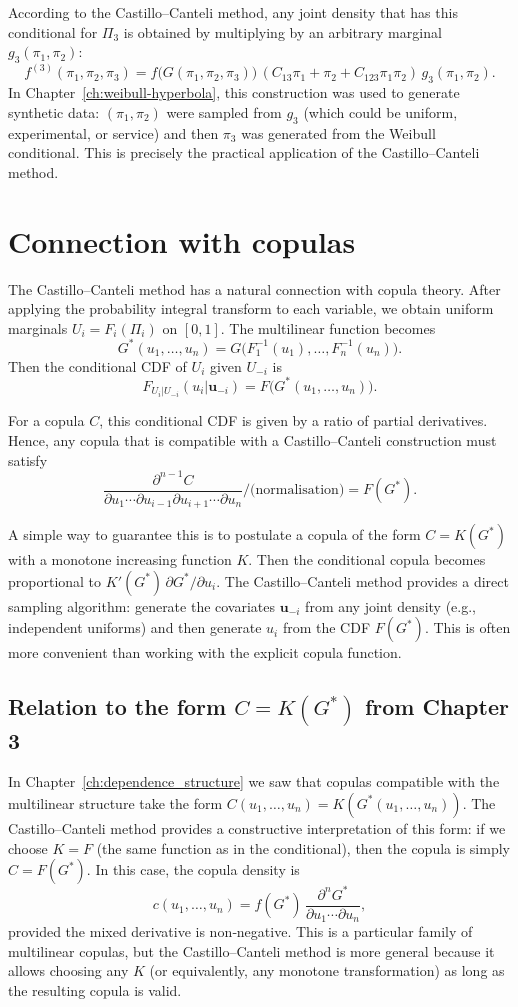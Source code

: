 According to the Castillo–Canteli method, any joint density that has this conditional for \(\Pi_3\) is obtained by multiplying by an arbitrary marginal \(g_3(\pi_1,\pi_2)\):
\[
f^{(3)}(\pi_1,\pi_2,\pi_3) = f\bigl(G(\pi_1,\pi_2,\pi_3)\bigr)\,(C_{13}\pi_1 + \pi_2 + C_{123}\pi_1\pi_2)\,g_3(\pi_1,\pi_2).
\]
In Chapter~\ref{ch:weibull-hyperbola}, this construction was used to generate synthetic data: \((\pi_1,\pi_2)\) were sampled from \(g_3\) (which could be uniform, experimental, or service) and then \(\pi_3\) was generated from the Weibull conditional. This is precisely the practical application of the Castillo–Canteli method.

\section{Connection with copulas}
\label{sec:cc-copulas}

The Castillo–Canteli method has a natural connection with copula theory. After applying the probability integral transform to each variable, we obtain uniform marginals \(U_i = F_i(\Pi_i)\) on \([0,1]\). The multilinear function becomes
\[
G^*(u_1,\ldots,u_n) = G\bigl(F_1^{-1}(u_1),\ldots,F_n^{-1}(u_n)\bigr).
\]
Then the conditional CDF of \(U_i\) given \(U_{-i}\) is
\[
F_{U_i|U_{-i}}(u_i|\mathbf{u}_{-i}) = F\bigl(G^*(u_1,\ldots,u_n)\bigr).
\]

For a copula \(C\), this conditional CDF is given by a ratio of partial derivatives. Hence, any copula that is compatible with a Castillo–Canteli construction must satisfy
\[
\frac{\partial^{n-1}C}{\partial u_1\cdots\partial u_{i-1}\partial u_{i+1}\cdots\partial u_n} \Big/ \text{(normalisation)} = F(G^*).
\]

A simple way to guarantee this is to postulate a copula of the form \(C = K(G^*)\) with a monotone increasing function \(K\). Then the conditional copula becomes proportional to \(K'(G^*)\,\partial G^*/\partial u_i\). The Castillo–Canteli method provides a direct sampling algorithm: generate the covariates \(\mathbf{u}_{-i}\) from any joint density (e.g., independent uniforms) and then generate \(u_i\) from the CDF \(F(G^*)\). This is often more convenient than working with the explicit copula function.

\subsection{Relation to the form \(C=K(G^*)\) from Chapter 3}

In Chapter~\ref{ch:dependence_structure} we saw that copulas compatible with the multilinear structure take the form \(C(u_1,\ldots,u_n)=K(G^*(u_1,\ldots,u_n))\). The Castillo–Canteli method provides a constructive interpretation of this form: if we choose \(K=F\) (the same function as in the conditional), then the copula is simply \(C=F(G^*)\). In this case, the copula density is
\[
c(u_1,\ldots,u_n) = f(G^*)\,\frac{\partial^nG^*}{\partial u_1\cdots\partial u_n},
\]
provided the mixed derivative is non‑negative. This is a particular family of multilinear copulas, but the Castillo–Canteli method is more general because it allows choosing any \(K\) (or equivalently, any monotone transformation) as long as the resulting copula is valid.

